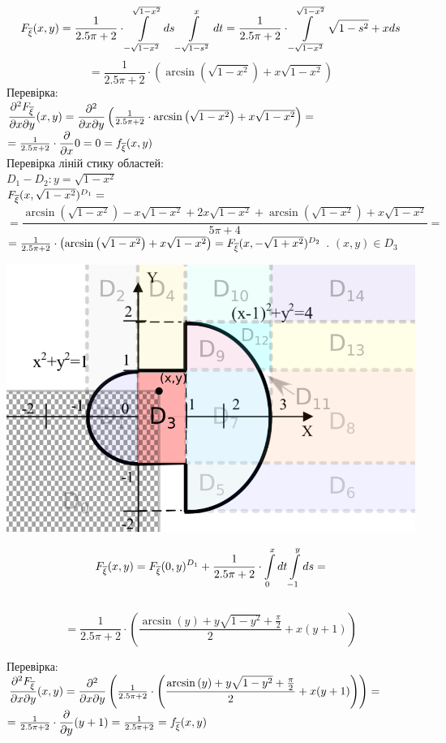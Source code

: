 \documentclass[14pt,a4paper]{scrartcl}
\theoremstyle{definition}
\theoremstyle{remark}
\theoremstyle{definition}
\theoremstyle{definition}
\begin{document}
$$
F_{\overline{\xi}} (x,y) =  \frac{1}{2.5\pi + 2} \cdot  \int\limits_{-\sqrt{1- x^2}}^{\sqrt{1- x^2}}{ds  \int\limits_{-\sqrt{1-s^2}}^{x}{dt}} =
\frac{1}{2.5\pi + 2} \cdot  \int\limits_{-\sqrt{1- x^2}}^{\sqrt{1- x^2}}{\sqrt{1-s^2}+xds  }
$$
$$
= \frac{1}{2.5\pi + 2} \cdot \left( \arcsin\left(\sqrt{1-x^2}\right)+x\sqrt{1-x^2} \right)
$$
Перевірка:\\
$\dfrac{\partial^2 F_{\overline{\xi}}}{\partial x \partial y}(x,y) = \dfrac{\partial^2}{\partial x \partial y} \left( \frac{1}{2.5\pi + 2} \cdot\arcsin\left(\sqrt{1-x^2}\right)+x\sqrt{1-x^2} \right) =$\\
$ = \frac{1}{2.5\pi + 2} \cdot \dfrac{\partial}{\partial x} 0 = 0 =f_{\overline{\xi}} (x,y)$\\

Перевірка ліній стику областей:\\
$D_1 - D_2: y = \sqrt{1- x^2}$\\
$ F_{\overline{\xi}} (x,\sqrt{1- x^2})^{D_1} = $\\
$=\dfrac{\arcsin\left(\sqrt{1-x^2}\right)-x\sqrt{1-x^2}+2x\sqrt{1-x^2}+\arcsin\left(\sqrt{1-x^2}\right)+x\sqrt{1-x^2}}{5\pi + 4} =$
\\$= \frac{1}{2.5\pi + 2} \cdot \left( \arcsin\left(\sqrt{1-x^2}\right)+x\sqrt{1-x^2} \right)  =F_{\overline{\xi}} (x,-\sqrt{1+x^2})^{D_2}$
. $(x,y) \in D_3$
\begin{center} \includegraphics[scale=0.4]{assets/zone43.png} \end{center}
$$
F_{\overline{\xi}} (x,y) =  F_{\overline{\xi}} (0,y)^{D_1}+ \frac{1}{2.5\pi + 2} \cdot  \int\limits_{0}^{ x}{dt  \int\limits_{-1}^{y }{ds}} =$$\\$$= \frac{1}{2.5\pi + 2} \cdot \left( \dfrac{\arcsin\left(y\right)+y\sqrt{1-y^2} + \frac{\pi}{2} }{2}+ x(y+1)\right)
$$

Перевірка:\\
$\dfrac{\partial^2 F_{\overline{\xi}}}{\partial x \partial y}(x,y) = \dfrac{\partial^2}{\partial x \partial y} \left(\frac{1}{2.5\pi + 2} \cdot \left( \dfrac{\arcsin\left(y\right)+y\sqrt{1-y^2} + \frac{\pi}{2} }{2}+ x(y+1)\right) \right) =$\\
$ = \frac{1}{2.5\pi + 2} \cdot \dfrac{\partial}{\partial y} (y+1) = \frac{1}{2.5\pi + 2} =f_{\overline{\xi}} (x,y)$\\
\end{document}
